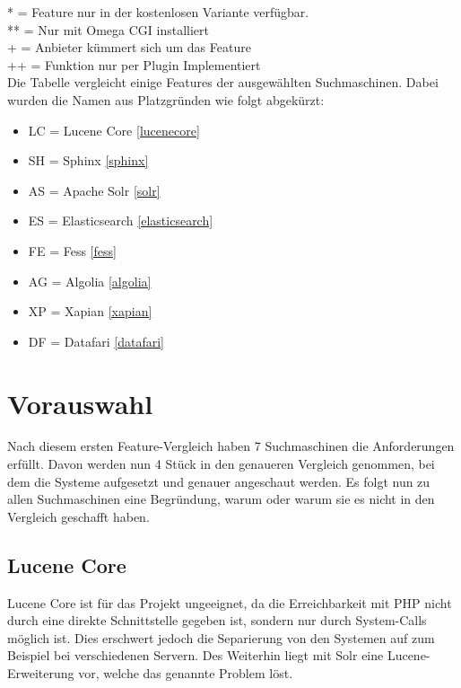 \begin{table}
    *  = Feature nur in der kostenlosen Variante verfügbar. \\
    ** = Nur mit Omega CGI installiert \\
    +  = Anbieter kümmert sich um das Feature \\
    ++  = Funktion nur per Plugin Implementiert \\

    Die Tabelle vergleicht einige Features der ausgewählten Suchmaschinen. Dabei wurden die Namen aus Platzgründen wie folgt abgekürzt:

    \begin{itemize}
        \item LC = Lucene Core \ref{lucenecore}
        \item SH = Sphinx \ref{sphinx}
        \item AS = Apache Solr \ref{solr}
        \item ES = Elasticsearch \ref{elasticsearch}
        \item FE = Fess \ref{fess}
        \item AG = Algolia \ref{algolia}
        \item XP = Xapian \ref{xapian}
        \item DF = Datafari \ref{datafari}
    \end{itemize} 


\end{table}

\section{Vorauswahl}

Nach diesem ersten Feature-Vergleich haben 7 Suchmaschinen die Anforderungen erfüllt. Davon werden nun 4 Stück in den genaueren Vergleich genommen, bei dem die Systeme aufgesetzt und genauer angeschaut werden. Es folgt nun zu allen Suchmaschinen eine Begründung, warum oder warum sie es nicht in den Vergleich geschafft haben.

\subsection{Lucene Core}


Lucene Core ist für das Projekt ungeeignet, da die Erreichbarkeit mit PHP nicht durch eine direkte Schnittstelle gegeben ist, sondern nur durch System-Calls möglich ist. Dies erschwert jedoch die Separierung von den Systemen auf zum Beispiel bei verschiedenen Servern. Des Weiterhin liegt mit Solr eine Lucene-Erweiterung vor, welche das genannte Problem löst. \cite{TheApacheSoftwareFoundation.2019b}

